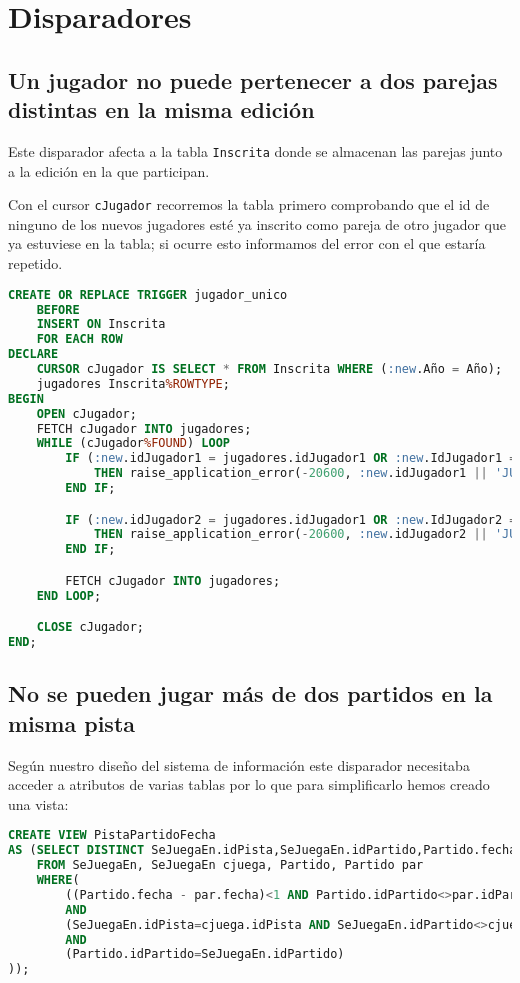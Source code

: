\section{Disparadores}

\subsection{Un jugador no puede pertenecer a dos parejas distintas en la misma edición}
Este disparador afecta a la tabla \texttt{Inscrita} donde se almacenan las parejas
junto a la edición en la que participan.

Con el cursor \texttt{cJugador} recorremos la tabla primero comprobando que el
id de ninguno de los nuevos jugadores esté ya inscrito como pareja de otro jugador
que ya estuviese en la tabla; si ocurre esto informamos del error con el que estaría repetido.


\begin{lstlisting}[language=sql]
CREATE OR REPLACE TRIGGER jugador_unico
	BEFORE
	INSERT ON Inscrita
	FOR EACH ROW
DECLARE
	CURSOR cJugador IS SELECT * FROM Inscrita WHERE (:new.Año = Año);
	jugadores Inscrita%ROWTYPE;
BEGIN
	OPEN cJugador;
	FETCH cJugador INTO jugadores;
	WHILE (cJugador%FOUND) LOOP
		IF (:new.idJugador1 = jugadores.idJugador1 OR :new.IdJugador1 = jugadores.idJugador2)
			THEN raise_application_error(-20600, :new.idJugador1 || 'JUGADOR 1: No se puede pertenecer a más de una pareja en la misma edicion');
		END IF;

		IF (:new.idJugador2 = jugadores.idJugador1 OR :new.IdJugador2 = jugadores.idJugador2)
			THEN raise_application_error(-20600, :new.idJugador2 || 'JUGADOR 2: No se puede pertenecer a más de una pareja en la misma edicion');
		END IF;

		FETCH cJugador INTO jugadores;
	END LOOP;

	CLOSE cJugador;
END;
\end{lstlisting}

\subsection{No se pueden jugar más de dos partidos en la misma pista}

Según nuestro diseño del sistema de información este disparador necesitaba acceder
a atributos de varias tablas por lo que para simplificarlo hemos creado una vista:

\begin{lstlisting}[language=sql]
CREATE VIEW PistaPartidoFecha
AS (SELECT DISTINCT SeJuegaEn.idPista,SeJuegaEn.idPartido,Partido.fecha
	FROM SeJuegaEn, SeJuegaEn cjuega, Partido, Partido par
	WHERE(
		((Partido.fecha - par.fecha)<1 AND Partido.idPartido<>par.idPartido)
		AND
		(SeJuegaEn.idPista=cjuega.idPista AND SeJuegaEn.idPartido<>cjuega.idPartido)
		AND
		(Partido.idPartido=SeJuegaEn.idPartido)
));
\end{lstlisting}

